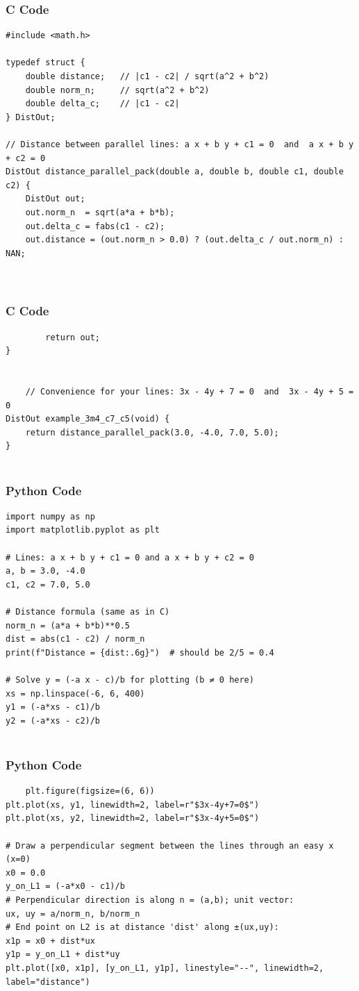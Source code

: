 \documentclass{beamer}
\begin{document}
 
\begin{frame}[fragile]
\frametitle{C Code }
\begin{lstlisting}
#include <math.h>

typedef struct {
    double distance;   // |c1 - c2| / sqrt(a^2 + b^2)
    double norm_n;     // sqrt(a^2 + b^2)
    double delta_c;    // |c1 - c2|
} DistOut;

// Distance between parallel lines: a x + b y + c1 = 0  and  a x + b y + c2 = 0
DistOut distance_parallel_pack(double a, double b, double c1, double c2) {
    DistOut out;
    out.norm_n  = sqrt(a*a + b*b);
    out.delta_c = fabs(c1 - c2);
    out.distance = (out.norm_n > 0.0) ? (out.delta_c / out.norm_n) : NAN;



\end{lstlisting}
\end{frame}

\begin{frame}[fragile]
    \frametitle{C Code}
    \begin{lstlisting}
        return out;
}
    
    
    // Convenience for your lines: 3x - 4y + 7 = 0  and  3x - 4y + 5 = 0
DistOut example_3m4_c7_c5(void) {
    return distance_parallel_pack(3.0, -4.0, 7.0, 5.0);
}


\end{lstlisting}
\end{frame}


\begin{frame}[fragile]
\frametitle{Python Code}
\begin{lstlisting}
import numpy as np
import matplotlib.pyplot as plt

# Lines: a x + b y + c1 = 0 and a x + b y + c2 = 0
a, b = 3.0, -4.0
c1, c2 = 7.0, 5.0

# Distance formula (same as in C)
norm_n = (a*a + b*b)**0.5
dist = abs(c1 - c2) / norm_n
print(f"Distance = {dist:.6g}")  # should be 2/5 = 0.4

# Solve y = (-a x - c)/b for plotting (b ≠ 0 here)
xs = np.linspace(-6, 6, 400)
y1 = (-a*xs - c1)/b
y2 = (-a*xs - c2)/b


    \end{lstlisting}
\end{frame}

\begin{frame}[fragile]
    \frametitle{Python Code}
    \begin{lstlisting}
    plt.figure(figsize=(6, 6))
plt.plot(xs, y1, linewidth=2, label=r"$3x-4y+7=0$")
plt.plot(xs, y2, linewidth=2, label=r"$3x-4y+5=0$")

# Draw a perpendicular segment between the lines through an easy x (x=0)
x0 = 0.0
y_on_L1 = (-a*x0 - c1)/b
# Perpendicular direction is along n = (a,b); unit vector:
ux, uy = a/norm_n, b/norm_n
# End point on L2 is at distance 'dist' along ±(ux,uy):
x1p = x0 + dist*ux
y1p = y_on_L1 + dist*uy
plt.plot([x0, x1p], [y_on_L1, y1p], linestyle="--", linewidth=2, label="distance")

    \end{lstlisting}
\end{frame}
\end{document}
